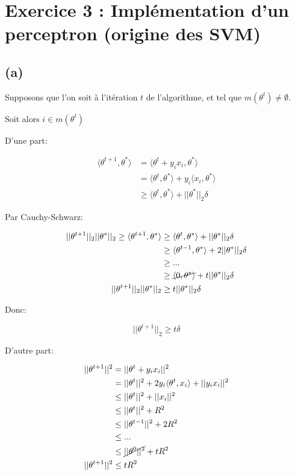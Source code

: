 \documentclass[
]{article}
\begin{document}
\hypertarget{exercice-3-impluxe9mentation-dun-perceptron-origine-des-svm}{%
\section{Exercice 3 : Implémentation d'un perceptron (origine des
SVM)}\label{exercice-3-impluxe9mentation-dun-perceptron-origine-des-svm}}

\hypertarget{a-2}{%
\subsection{(a)}\label{a-2}}

Supposons que l'on soit à l'itération \(t\) de l'algorithme, et tel que
\(m(\theta^t) \neq \emptyset\).

Soit alors \(i \in m(\theta^t)\)

D'une part:

\begin{align*}
    \langle \theta^{t+1}, \theta^* \rangle & = \langle \theta^{t} + y_i x_i, \theta^* \rangle\\
    & = \langle \theta^{t}, \theta^* \rangle + y_i \langle x_i, \theta^* \rangle\\
    & \geq \langle \theta^{t}, \theta^* \rangle + ||\theta^*||_2 \delta
\end{align*}

Par Cauchy-Schwarz:

\begin{align*}
|| \theta^{t+1} ||_2 || \theta^* ||_2 \geq \langle \theta^{t+1}, \theta^* \rangle &\geq \langle \theta^{t}, \theta^* \rangle + ||\theta^*||_2 \delta\\
&\geq \langle \theta^{t-1}, \theta^* \rangle + 2||\theta^*||_2 \delta\\
&\geq ...\\
&\geq \cancel{\langle 0, \theta^* \rangle} + t||\theta^*||_2 \delta\\
||\theta^{t+1} ||_2 || \theta^* ||_2 &\geq t||\theta^*||_2 \delta\\
\end{align*}

Donc:

\begin{equation} \label{eq:geq}
    \boxed{||\theta^{t+1} ||_2 \geq t \delta}
\end{equation}

D'autre part:

\begin{align*}
||\theta^{t+1}||^2  &= ||\theta^t + y_i x_i||^2\\
                    &= ||\theta^t||^2 + 2 y_i \langle \theta^t, x_i \rangle + ||y_i x_i||^2\\
                    &\leq ||\theta^t||^2 + ||x_i||^2\\
                    &\leq ||\theta^t||^2 + R^2\\
                    &\leq ||\theta^{t-1}||^2 + 2 R^2\\
                    &\leq ...\\
                    &\leq \cancel{||\theta^{0}||^2} + t R^2\\
||\theta^{t+1}||^2  &\leq t R^2
\end{align*}
\end{document}
